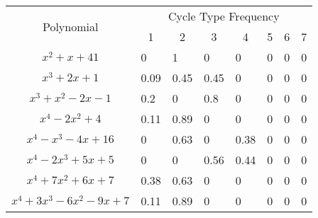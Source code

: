 \documentclass{article}
\begin{document}
\begin{table}[hp]
\begin{center}
\begin{tabular}{|c|lllllll|}
\hline
\multirow{2}{*}{Polynomial}                                   & \multicolumn{7}{c|}{Cycle Type Frequency}                                                                                                                                      \\ \cline{2-8} 
                                                     & \multicolumn{1}{c}{1} & \multicolumn{1}{c}{2} & \multicolumn{1}{c}{3} & \multicolumn{1}{c}{4} & \multicolumn{1}{c}{5} & \multicolumn{1}{c}{6} & \multicolumn{1}{c|}{7} \\ \hline
$x^2+x+41$                                           & 0                     & 1                     & 0                     & 0                     & 0                     & 0                     & 0                      \\
$x^3+2x+1$                                           & 0.09                  & 0.45                  & 0.45                  & 0                     & 0                     & 0                     & 0                      \\
$x^3+x^2-2x-1$                                       & 0.2                   & 0                     & 0.8                   & 0                     & 0                     & 0                     & 0                      \\
$x^4-2x^2+4$                                         & 0.11                  & 0.89                  & 0                     & 0                     & 0                     & 0                     & 0                      \\
$x^4-x^3-4x+16$                                      & 0                     & 0.63                  & 0                     & 0.38                  & 0                     & 0                     & 0                      \\
$ x^4 - 2x^3 + 5x + 5$                               & 0                     & 0                     & 0.56                  & 0.44                  & 0                     & 0                     & 0                      \\
$x^4 + 7x^2 + 6x + 7$             & 0.38                  & 0.63                  & 0                     & 0                     & 0                     & 0                     & 0                      \\
$ x^4 + 3x^3 - 6x^2 - 9x + 7$    & 0.11                  & 0.89                  & 0                     & 0                     & 0                     & 0                     & 0                      \\

\end{tabular}
\end{center}
\end{table}
\end{document}
